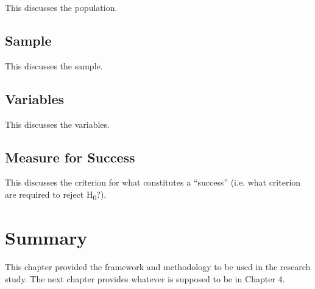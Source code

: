 This discusses the population.


\subsection{Sample}

This discusses the sample.


\subsection{Variables}

This discusses the variables.


\subsection{Measure for Success}

This discusses the criterion for what constitutes a ``success'' (i.e. what criterion are required to reject H\textsubscript{0}?).


\section{Summary}

This chapter provided the framework and methodology to be used in the research study.
The next chapter provides whatever is supposed to be in Chapter 4.
